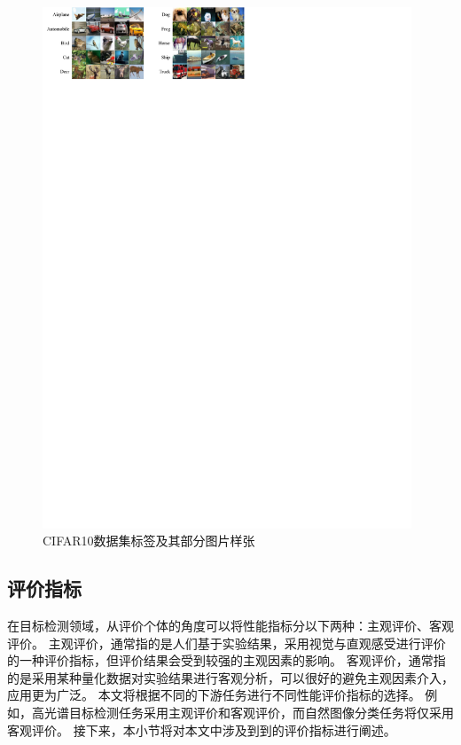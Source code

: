\documentclass{xdupgthesis}
\begin{document}
\begin{figure}[ht]
    \centering
    \includegraphics[width=0.98\textwidth]{CIFAR10_image-v2.pdf}
    \caption{CIFAR10数据集标签及其部分图片样张}
    \label{fig_CIFAR10_image}
\end{figure}

\subsection{评价指标}
在目标检测领域，从评价个体的角度可以将性能指标分以下两种：主观评价、客观评价。
主观评价，通常指的是人们基于实验结果，采用视觉与直观感受进行评价的一种评价指标，但评价结果会受到较强的主观因素的影响。
客观评价，通常指的是采用某种量化数据对实验结果进行客观分析，可以很好的避免主观因素介入，应用更为广泛。
本文将根据不同的下游任务进行不同性能评价指标的选择。
例如，高光谱目标检测任务采用主观评价和客观评价，而自然图像分类任务将仅采用客观评价。
接下来，本小节将对本文中涉及到到的评价指标进行阐述。
\end{document}
